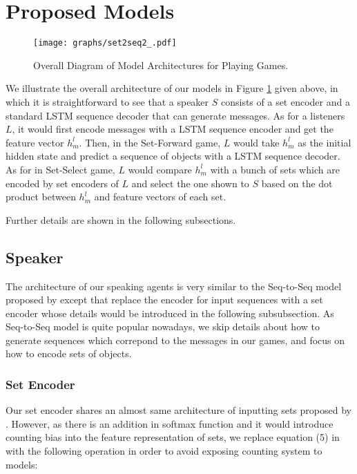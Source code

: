 \section{Proposed Models}
\label{sec3.2:models}

\begin{figure}[!h]
  \centering
  \texttt{[image: graphs/set2seq2\_.pdf]}
  \caption{Overall Diagram of Model Architectures for Playing Games.}
  \label{fig4:model_arch}
\end{figure}

We illustrate the overall architecture of our models in Figure \ref{fig4:model_arch} given above, in which it is straightforward to see that a speaker $S$ consists of a set encoder and a standard LSTM sequence decoder that can generate messages. As for a listeners $L$, it would first encode messages with a LSTM sequence encoder and get the feature vector $h^l_m$. Then, in the Set-Forward game, $L$ would take $h^l_m$ as the initial hidden state and predict a sequence of objects with a LSTM sequence decoder. As for in Set-Select game, $L$ would compare $h^l_m$ with a bunch of sets which are encoded by set encoders of $L$ and select the one shown to $S$ based on the dot product between $h^l_m$ and feature vectors of each set.

Further details are shown in the following subsections.

\subsection{Speaker}
\label{ssec3.2.1:speaker}

The architecture of our speaking agents is very similar to the Seq-to-Seq model proposed by \cite{sutskever2014sequence} except that replace the encoder for input sequences with a set encoder whose details would be introduced in the following subsubsection. As Seq-to-Seq model is quite popular nowadays, we skip details about how to generate sequences which correpond to the messages in our games, and focus on how to encode sets of objects.

\subsubsection{Set Encoder}
\label{sssec3.2.1.1:set_encoder}

Our set encoder shares an almost same architecture of inputting sets proposed by \cite{vinyals2015order}. However, as there is an addition in softmax function and it would introduce counting bias into the feature representation of sets, we replace equation (5) in \cite{vinyals2015order} with the following operation in order to avoid exposing counting system to models:

